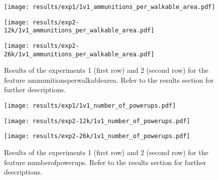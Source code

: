  
\begin{figure}[h!]
    \centering
	\begin{minipage}{0.3\linewidth}
		\texttt{[image: results/exp1/1v1\_ammunitions\_per\_walkable\_area.pdf]}
	\end{minipage}

	\begin{minipage}{0.3\linewidth}
		\texttt{[image: results/exp2-12k/1v1\_ammunitions\_per\_walkable\_area.pdf]}
	\end{minipage}
	\begin{minipage}{0.3\linewidth}
		\texttt{[image: results/exp2-26k/1v1\_ammunitions\_per\_walkable\_area.pdf]}
	\end{minipage}

	\caption[ Results: Feature ammunitions\textunderscore per\textunderscore walkable\textunderscore area]{ Results of the experiments 1 (first row) and 2 (second row) for the feature ammunitions\textunderscore per\textunderscore walkable\textunderscore area. Refer to the results section for further descriptions. }
	\label{fig:appendix_ammunitions_per_walkable_area}
\end{figure}
 
\begin{figure}[h!]
    \centering
	\begin{minipage}{0.3\linewidth}
		\texttt{[image: results/exp1/1v1\_number\_of\_powerups.pdf]}
	\end{minipage}

	\begin{minipage}{0.3\linewidth}
		\texttt{[image: results/exp2-12k/1v1\_number\_of\_powerups.pdf]}
	\end{minipage}
	\begin{minipage}{0.3\linewidth}
		\texttt{[image: results/exp2-26k/1v1\_number\_of\_powerups.pdf]}
	\end{minipage}

	\caption[ Results: Feature number\textunderscore of\textunderscore powerups]{ Results of the experiments 1 (first row) and 2 (second row) for the feature number\textunderscore of\textunderscore powerups. Refer to the results section for further descriptions. }
	\label{fig:appendix_number_of_powerups}
\end{figure}
 \newpage 

